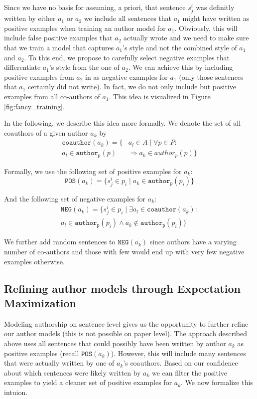 Since we have no basis for assuming, a priori, that sentence $s_j^i$ was definitly written by either $a_1$ or $a_2$ we include all sentences that $a_1$ might have written as positive examples when training an author model for $a_1$. 
Obviously, this will include false positive examples that $a_2$ actually wrote and we need to make sure that we train a model that captures $a_1$'s style and not the combined style of $a_1$ and $a_2$.
To this end, we propose to carefully select negative examples that differentiate $a_1$'s style from the one of $a_2$.
We can achieve this by including positive examples from $a_2$ in as negative examples for $a_1$ (only those sentences that $a_1$ certainly did not write).
In fact, we do not only include but positive examples from all co-authors of $a_1$.
This idea is visualized in Figure \ref{fig:fancy_training}.

In the following, we describe this idea more formally.
We denote the set of all coauthors of a given author $a_k$ by 
\begin{align*}
\mathtt{coauthor}(a_k) =  \{ &a_l \in A \;|\; \forall p\in P: \\
a_l \in \mathtt{author_p}(p) & \Rightarrow a_k \in author_p(p) \}
\end{align*}

Formally, we use the following set of positive examples for $a_k$:
$$ \mathtt{POS}(a_k) = \{ s_j^i \in p_i \;|\; a_k \in \mathtt{author_p}(p_i)\}$$

And the following set of negative examples for $a_k$:
\begin{align*}
\mathtt{NEG}(a_k) = \{ s_j^i \in p_i \;|\; \exists  a_l \in \mathtt{coauthor}(a_k): \\
 a_l \in \mathtt{author_p}(p_i) \wedge a_k \notin \mathtt{author_p}(p_i) \}
\end{align*}

We further add random sentences to $\mathtt{NEG}(a_k)$ since authors have a varying number of co-authors and those with few would end up with very few negative examples otherwise.

\subsection{Refining author models through Expectation Maximization}
Modeling authorship on sentence level gives us the opportunity to further refine our author models (this is not possible on paper level).
The approach described above uses all sentences that could possibly have been written by author $a_k$ as positive examples (recall $\mathtt{POS}(a_k)$).
However, this will include many sentences that were actually written by  one of $a_k$'s coauthors.
Based on our confidence about which sentences were likely written by $a_k$ we can filter the positive examples to yield a cleaner set of positive examples for $a_k$.
We now formalize this intuion.

